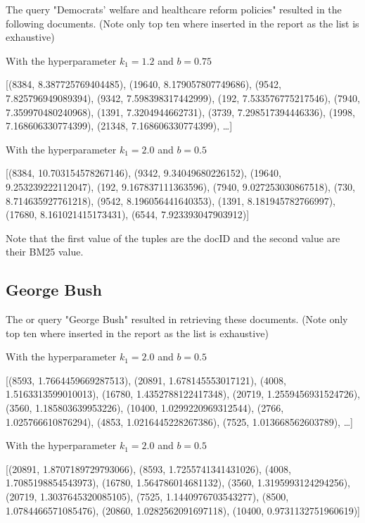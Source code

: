 \par The query "Democrats’ welfare and healthcare reform policies" resulted in the following documents. (Note only top ten where inserted in the report as the list is exhaustive)
\par With the hyperparameter $k_1=1.2$ and $b=0.75$
\begin{center}
    [(8384, 8.387725769404485), (19640, 8.179057807749686), (9542, 7.825796949089394), (9342, 7.598398317442999), (192, 7.533576775217546), (7940, 7.359970480240968), (1391, 7.3204944662731), (3739, 7.298517394446336), (1998, 7.168606330774399), (21348, 7.168606330774399), \dots]
\end{center}
\par With the hyperparameter $k_1=2.0$ and $b=0.5$
\begin{center}
    [(8384, 10.703154578267146), (9342, 9.34049680226152), (19640, 9.253239222112047), (192, 9.167837111363596), (7940, 9.027253030867518), (730, 8.714635927761218), (9542, 8.196056441640353), (1391, 8.181945782766997), (17680, 8.161021415173431), (6544, 7.923393047903912)]
\end{center}

\par Note that the first value of the tuples are the docID and the second value are their BM25 value.

\subsection{George Bush}

\par The or query "George Bush" resulted in retrieving these documents. (Note only top ten where inserted in the report as the list is exhaustive)
\par With the hyperparameter $k_1=2.0$ and $b=0.5$
\begin{center}
    [(8593, 1.7664459669287513), (20891, 1.678145553017121), (4008, 1.5163313599010013), (16780, 1.4352788122417348), (20719, 1.2559456931524726), (3560, 1.185803639953226), (10400, 1.0299220969312544), (2766, 1.025766610876294), (4853, 1.0216445228267386), (7525, 1.013668562603789), \dots]
\end{center}

\par With the hyperparameter $k_1=2.0$ and $b=0.5$
\begin{center}
    [(20891, 1.8707189729793066), (8593, 1.7255741341431026), (4008, 1.7085198854543973), (16780, 1.564786014681132), (3560, 1.3195993124294256), (20719, 1.3037645320085105), (7525, 1.1440976703543277), (8500, 1.0784466571085476), (20860, 1.0282562091697118), (10400, 0.9731132751960619)]
\end{center}

